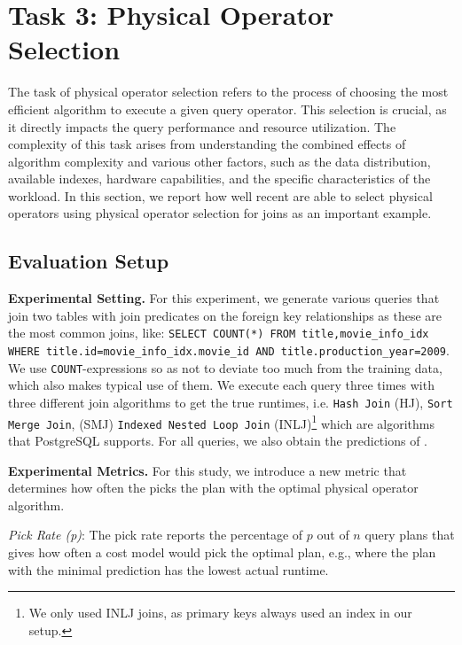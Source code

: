 \section{Task 3: Physical Operator Selection}\label{sec:physical_operator}
The task of physical operator selection refers to the process of choosing the most efficient algorithm to execute a given query operator. 
This selection is crucial, as it directly impacts the query performance and resource utilization. 
The complexity of this task arises from understanding the combined effects of algorithm complexity and various other factors, such as the data distribution, available indexes, hardware capabilities, and the specific characteristics of the workload. 
In this section, we report how well recent \lcms are able to select physical operators using physical operator selection for joins as an important example.

\subsection{Evaluation Setup}
\noindent\textbf{Experimental Setting.}
For this experiment, we generate various queries that join two tables with join predicates on the foreign key relationships as these are the most common joins, like: \texttt{SELECT COUNT(*) FROM title,movie\_info\_idx WHERE title.id=movie\_info\_idx.movie\_id AND title.production\_year=2009}.
We use \texttt{COUNT}-expressions so as not to deviate too much from the training data, which also makes typical use of them.
We execute each query three times with three different join algorithms to get the true runtimes, i.e. \texttt{Hash Join} (HJ), \texttt{Sort Merge Join}, (SMJ) \texttt{Indexed Nested Loop Join} (INLJ)\footnote{We only used INLJ joins, as primary keys always used an index in our setup.} which are algorithms that PostgreSQL supports.
For all queries, we also obtain the predictions of \lcms.

\noindent\textbf{Experimental Metrics.}
For this study, we introduce a new metric that determines how often the \lcm picks the plan with the optimal physical operator algorithm.
\begin{definition}
\textit{Pick Rate (p)}: The pick rate reports the percentage of $p$ out of $n$ query plans that gives how often a cost model would pick the optimal plan, e.g., where the plan with the minimal prediction has the lowest actual runtime.
\end{definition}
